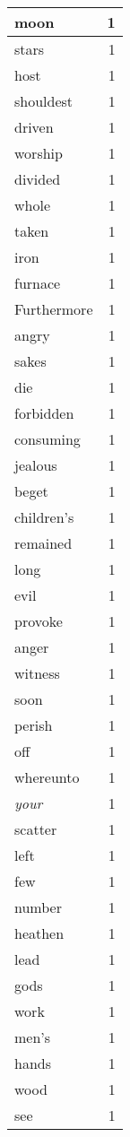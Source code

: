 \begin{center}
\begin{longtable}{l|r}
moon & 1 \\ \hline
stars & 1 \\ \hline
host & 1 \\ \hline
shouldest & 1 \\ \hline
driven & 1 \\ \hline
worship & 1 \\ \hline
divided & 1 \\ \hline
whole & 1 \\ \hline
taken & 1 \\ \hline
iron & 1 \\ \hline
furnace & 1 \\ \hline
Furthermore & 1 \\ \hline
angry & 1 \\ \hline
sakes & 1 \\ \hline
die & 1 \\ \hline
forbidden & 1 \\ \hline
consuming & 1 \\ \hline
jealous & 1 \\ \hline
beget & 1 \\ \hline
children's & 1 \\ \hline
remained & 1 \\ \hline
long & 1 \\ \hline
evil & 1 \\ \hline
provoke & 1 \\ \hline
anger & 1 \\ \hline
witness & 1 \\ \hline
soon & 1 \\ \hline
perish & 1 \\ \hline
off & 1 \\ \hline
whereunto & 1 \\ \hline
\emph{your} & 1 \\ \hline
scatter & 1 \\ \hline
left & 1 \\ \hline
few & 1 \\ \hline
number & 1 \\ \hline
heathen & 1 \\ \hline
lead & 1 \\ \hline
gods & 1 \\ \hline
work & 1 \\ \hline
men's & 1 \\ \hline
hands & 1 \\ \hline
wood & 1 \\ \hline
see & 1 \\ \hline

\end{longtable}
\end{center}
